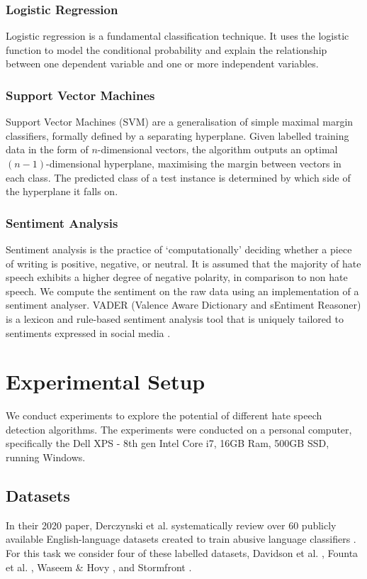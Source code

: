 \documentclass[a4paper,12pt]{report}
\begin{document}
\subsubsection{Logistic Regression}
Logistic regression is a fundamental classification technique. It uses the logistic function to model the conditional probability and explain the relationship between one dependent variable and one or more independent variables.  

\subsubsection{Support Vector Machines}
Support Vector Machines (SVM) are a generalisation of simple maximal margin classifiers, formally defined by a separating hyperplane. Given labelled training data in the form of $n$-dimensional vectors, the algorithm outputs an optimal $(n-1)$-dimensional hyperplane, maximising the margin between vectors in each class. The predicted class of a test instance is determined by which side of the hyperplane it falls on.

\subsubsection{Sentiment Analysis}
Sentiment analysis is the practice of ‘computationally' deciding whether a piece of writing is positive, negative, or neutral. It is assumed that the majority of hate speech exhibits a higher degree of negative polarity, in comparison to non hate speech. We compute the sentiment on the raw data using an implementation of a sentiment analyser. VADER (Valence Aware Dictionary and sEntiment Reasoner) is a lexicon and rule-based sentiment analysis tool that is uniquely tailored to sentiments expressed in social media \cite{hutto2014vader}.

\section{Experimental Setup}
We conduct experiments to explore the potential of different hate speech detection algorithms. The experiments were conducted on a personal computer, specifically the  Dell XPS - 8th gen Intel Core i7, 16GB Ram, 500GB SSD, running Windows.

\subsection{Datasets}
In their 2020 paper, Derczynski et al. systematically review over 60 publicly available English-language datasets created to train abusive language classifiers \cite{vidgen2020directions}. For this task we consider four of these labelled datasets, Davidson et al. \cite{davidson2017automated}, Founta et al. \cite{founta2018large}, Waseem \& Hovy \cite{waseem-hovy:2016:N16-2}, and Stormfront \cite{waseem-hovy:2016:N16-2}.
\end{document}
